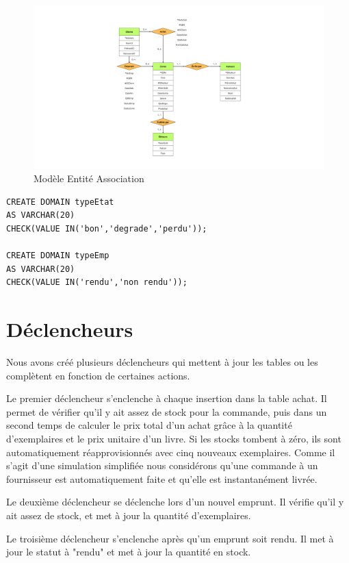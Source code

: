 \documentclass[10pt,a4paper,parskip=full*,DIV=11]{scrartcl}
\begin{document}
\begin{figure}
    \centering
    \includegraphics[trim=6cm 0cm 5cm 0cm, clip, width=1.2\textwidth]{MEA_BD}
    \caption{Modèle Entité Association}\label{fig.mea}
\end{figure}

\begin{lstlisting}
CREATE DOMAIN typeEtat
AS VARCHAR(20) 
CHECK(VALUE IN('bon','degrade','perdu'));

CREATE DOMAIN typeEmp
AS VARCHAR(20) 
CHECK(VALUE IN('rendu','non rendu'));
\end{lstlisting}

\section{Déclencheurs}
Nous avons créé plusieurs déclencheurs qui mettent à jour les tables ou les complètent en fonction de certaines actions.

	Le premier déclencheur s’enclenche à chaque insertion dans la table achat. Il permet de vérifier qu’il y ait assez de stock pour la commande, puis dans un second temps de calculer le 
    prix total d’un achat grâce à la quantité d’exemplaires et le prix unitaire d’un livre. Si les stocks tombent à zéro, ils sont automatiquement réapprovisionnés avec cinq nouveaux 
    exemplaires. Comme il s’agit d’une simulation simplifiée nous considérons qu’une commande à un fournisseur est automatiquement faite et qu’elle est instantanément livrée.

Le deuxième déclencheur se déclenche lors d’un nouvel emprunt. Il vérifie qu’il y ait assez de stock, et met à jour la quantité d’exemplaires.

Le troisième déclencheur s’enclenche après qu’un emprunt soit rendu. Il met à jour le statut à "rendu" et met à jour la quantité en stock.
\end{document}
